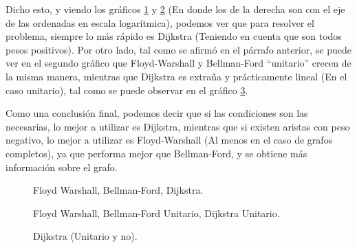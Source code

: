 \documentclass[a4paper,10pt]{article}
\begin{document}
	Dicho esto, y viendo los gráficos \ref{fig:fw-bf-d} y \ref{fig:fw-bfu-du} (En donde los de la derecha son con el eje de las ordenadas en escala logarítmica), podemos ver que para resolver el problema, siempre lo más rápido es Dijkstra (Teniendo en cuenta que son todos pesos positivos). Por otro lado, tal como se afirmó en el párrafo anterior, se puede ver en el segundo gráfico que Floyd-Warshall y Bellman-Ford ``unitario'' crecen de la misma manera, mientras que Dijkstra es extraña y prácticamente lineal (En el caso unitario), tal como se puede observar en el gráfico \ref{fig:dijkstra}.

	Como una conclusión final, podemos decir que si las condiciones son las necesarias, lo mejor a utilizar es Dijkstra, mientras que si existen aristas con peso negativo, lo mejor a utilizar es Floyd-Warshall (Al menos en el caso de grafos completos), ya que performa mejor que Bellman-Ford, y se obtiene más información sobre el grafo.

	\begin{figure}[!htb]
		\caption{Floyd Warshall, Bellman-Ford, Dijkstra.}
		\label{fig:fw-bf-d}
	\end{figure}

	\begin{figure}[!htb]
		\caption{Floyd Warshall, Bellman-Ford Unitario, Dijkstra Unitario.}
		\label{fig:fw-bfu-du}
	\end{figure}
	
	\begin{figure}[!htb]
		\caption{Dijkstra (Unitario y no).}
		\label{fig:dijkstra}
	\end{figure}
\end{document}
